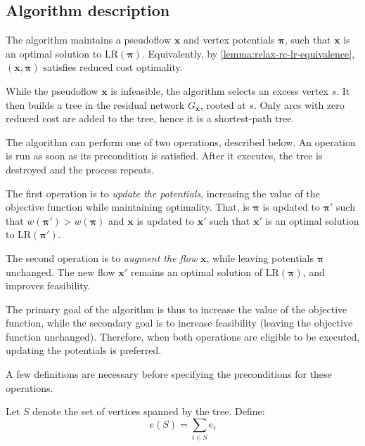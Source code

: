 \subsection{Algorithm description}

The algorithm maintains a pseudoflow $\mathbf{x}$ and vertex potentials $\boldsymbol{\pi}$, such that $\mathbf{x}$ is an optimal solution to $\mathrm{LR}(\boldsymbol{\pi})$. Equivalently, by \cref{lemma:relax-rc-lr-equivalence}, $\left(\mathbf{x},\boldsymbol{\pi}\right)$ satisfies reduced cost optimality.

While the pseudoflow $\mathbf{x}$ is infeasible, the algorithm selects an excess vertex $s$. It then builds a tree in the residual network $G_{\mathbf{x}}$, rooted at $s$. Only arcs with zero reduced cost are added to the tree, hence it is a shortest-path tree.

The algorithm can perform one of two operations, described below. An operation is run as soon as its precondition is satisfied. After it executes, the tree is destroyed and the process repeats.

The first operation is to \emph{update the potentials}, increasing the value of the objective function while maintaining optimality. That, is $\boldsymbol{\pi}$ is updated to $\boldsymbol{\pi}'$ such that $w\left(\boldsymbol{\pi}'\right) > w\left(\boldsymbol{\pi}\right)$ and $\mathbf{x}$ is updated to $\mathbf{x}'$ such that $\mathbf{x}'$ is an optimal solution to $\mathrm{LR}(\boldsymbol{\pi}')$.

The second operation is to \emph{augment the flow} $\mathbf{x}$, while leaving potentials $\boldsymbol{\pi}$ unchanged. The new flow $\mathbf{x}'$ remains an optimal solution of $\mathrm{LR}(\boldsymbol{\pi})$, and improves feasibility.

The primary goal of the algorithm is thus to increase the value of the objective function, while the secondary goal is to increase feasibility (leaving the objective function unchanged). Therefore, when both operations are eligible to be executed, updating the potentials is preferred. 

A few definitions are necessary before specifying the preconditions for these operations.\\

\begin{defn} \label{defn:relax-tree-excess}
Let $S$ denote the set of vertices spanned by the tree. Define:
\begin{equation} \label{eq:relax-tree-excess}
e(S) = \sum_{i \in S} e_i
\end{equation}
\end{defn}


